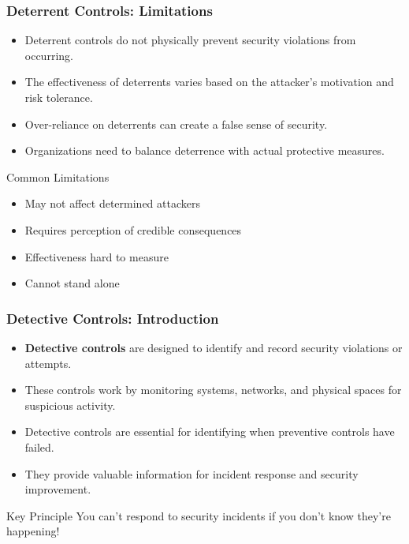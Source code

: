 \documentclass{beamer}
\begin{document}
\begin{frame}
    \frametitle{Deterrent Controls: Limitations}
    
    \begin{itemize}
        \item Deterrent controls do not physically prevent security violations from occurring.
        
        \item The effectiveness of deterrents varies based on the attacker's motivation and risk tolerance.
        
        \item Over-reliance on deterrents can create a false sense of security.
        
        \item Organizations need to balance deterrence with actual protective measures.
    \end{itemize}
    
    \begin{block}{Common Limitations}
        \begin{itemize}
            \item May not affect determined attackers
            \item Requires perception of credible consequences
            \item Effectiveness hard to measure
            \item Cannot stand alone
        \end{itemize}
    \end{block}
\end{frame}

\begin{frame}
    \frametitle{Detective Controls: Introduction}
    
    \begin{itemize}
        \item \textbf{Detective controls} are designed to identify and record security violations or attempts.
        
        \item These controls work by monitoring systems, networks, and physical spaces for suspicious activity.
        
        \item Detective controls are essential for identifying when preventive controls have failed.
        
        \item They provide valuable information for incident response and security improvement.
    \end{itemize}
    
    \begin{alertblock}{Key Principle}
        You can't respond to security incidents if you don't know they're happening!
    \end{alertblock}
\end{frame}
\end{document}
